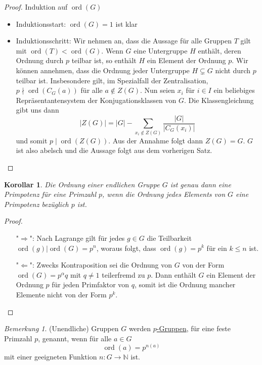 \documentclass[12pt]{scrartcl} %
\DeclareMathOperator{\ord}{ord}
\newcommand\N{\mathbb{N}}
\newtheorem{kor}{Korollar}
\theoremstyle{definition}
\theoremstyle{remark}
\newtheorem*{nb}{Bemerkung}
\newcommand{\defi}{\underline}
\begin{document}
\begin{proof}
	Induktion auf $\ord(G)$
	\begin{itemize}
	\item Induktionsstart: $\ord(G)=1$ ist klar
	\item Induktionsschritt: Wir nehmen an, dass die Aussage für alle Gruppen \(T\) gilt mit $\ord(T)<\ord(G)$.
		Wenn \(G\) eine Untergruppe \(H\) enthält, deren Ordnung durch \(p\) teilbar ist, so enthält \(H\) ein Element der Ordnung \(p\).
		Wir können annehmen, dass die Ordnung jeder Untergruppe $H \subsetneq G$ nicht durch \(p\) teilbar ist.
		Insbesondere gilt, im Spezialfall der Zentralisation, $p \nmid \ord(C_{G}(a))$ für alle $a \notin Z(G)$.
		Nun seien \(x_i\) für \(i \in I\) ein beliebiges Repräsentantensystem der Konjugationsklassen von \(G\).
		Die Klassengleichung gibt uns dann \[|Z(G)| = |G| - \sum_{x_i \notin Z(G)}\dfrac{|G|}{|C_{G}(x_i)|}\] und somit $p \mid \ord(Z(G))$.
		Aus der Annahme folgt dann \(Z(G)=G\).
		\(G\) ist also abelsch und die Aussage folgt aus dem vorherigen Satz.\qedhere
\end{itemize}
\end{proof}

\begin{kor}
	Die Ordnung einer endlichen Gruppe \(G\) ist genau dann eine Primpotenz für eine Primzahl \(p\), wenn die Ordnung jedes Elements von \(G\) eine Primpotenz bezüglich \(p\) ist.
\end{kor}

\begin{proof}
	\begin{itemize}
	\item["$\Rightarrow$":] Nach Lagrange gilt für jedes \(g\in G\) die Teilbarkeit \(\ord(g) | \ord(G)=p^n\), woraus folgt, dass $\ord(g)=p^k$ für ein \(k \leq n\) ist.
	\item["$\Leftarrow$":] Zwecks Kontraposition sei die Ordnung von \(G\) von der Form $\ord(G)=p^\alpha q$ mit $q\neq 1$ teilerfremd zu \(p\).
		Dann enthält \(G\) ein Element der Ordnung \(p\) für jeden Primfaktor von \(q\), somit ist die Ordnung mancher Elemente nicht von der Form $p^k$.
	\end{itemize}
\end{proof}

\begin{nb}
	(Unendliche) Gruppen \(G\) werden \defi{\(p\)-Gruppen}, für eine feste Primzahl \(p\), genannt, wenn für alle \(a \in G\) \[\ord(a)=p^{n(a)}\] mit einer geeigneten Funktion \(n: G \to \N\) ist.
\end{nb}
\end{document}

